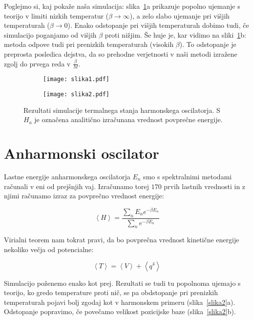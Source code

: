 \documentclass[a4paper]{article}
\newcommand{\expected}[1]{\left\langle #1 \right\rangle}
\begin{document}
    Poglejmo si, kaj pokaže naša simulacija: slika~\ref{slika1}a prikazuje popolno ujemanje s teorijo v limiti nizkih
    temperatur ($\beta \to \infty$), a zelo slabo ujemanje pri višjih temperaturah ($\beta \to 0$).
    Enako odstopanje pri višjih temperaturah dobimo tudi, če simulacijo poganjamo od višjih $\beta$ proti nižjim.
    Še huje je, kar vidimo na sliki~\ref{slika1}b: metoda odpove tudi pri prenizkih temperaturah (visokih $\beta$).
    To odstopanje je preprosta posledica dejstva, da so prehodne verjetnosti v naši metodi izražene zgolj do prvega
    reda v $\frac{\beta}{M}$.

    \begin{figure}
        \centering
        \begin{subfigure}{\textwidth}
            \texttt{[image: slika1.pdf]}
            \caption{}
        \end{subfigure}
        \begin{subfigure}{\textwidth}
            \texttt{[image: slika2.pdf]}
            \caption{}
        \end{subfigure}
        \caption{Rezultati simulacije termalnega stanja harmonskega oscilatorja.
        S $H_a$ je označena analitično izračunana vrednost povprečne energije.}
        \label{slika1}
    \end{figure}

    \section{Anharmonski oscilator}

    Lastne energije anharmonskega oscilatorja $E_n$ smo s spektralnimi metodami računali v eni od prejšnjih vaj.
    Izračunamo torej $170$ prvih lastnih vrednosti in z njimi računamo izraz za povprečno vrednost energije:

    \begin{equation}\label{eq9}
        \expected{H} = \frac{\sum_n E_n e^{-\beta E_n}}{\sum_n e^{-\beta E_n}}
    \end{equation}

    Virialni teorem nam tokrat pravi, da bo povprečna vrednost kinetične energije nekoliko večja od potencialne:

    \begin{equation}\label{eq10}
        \expected{T} = \expected{V} + \expected{q^4}
    \end{equation}

    Simulacijo poženemo enako kot prej.
    Rezultati se tudi tu popolnoma ujemajo s teorijo, ko gredo temperature proti nič, se pa obdstopanje pri prenizkih
    temperaturah pojavi bolj zgodaj kot v harmonskem primeru (slika~\ref{slika2}a).
    Odstopanje popravimo, če povečamo velikost pozicijske baze (slika~\ref{slika2}b).
\end{document}
